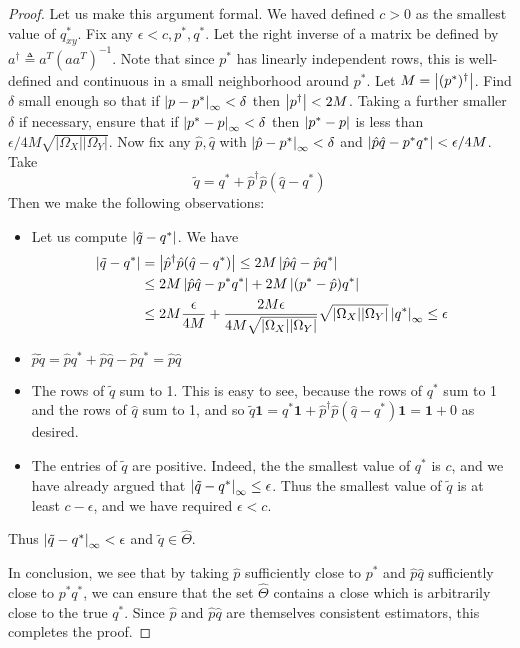 \begin{proof}
Let us make this argument formal.  We haved defined $c>0$ as the smallest value of $q^*_{xy}$.  Fix any $\epsilon<c, p^*,q^*$.  Let the right inverse of a matrix be defined by $a^\dagger \triangleq a^T (aa^T)^{-1}$.  Note that since $p^*$ has linearly independent rows, this is well-defined and continuous in a small neighborhood around $p^*$.  Let $M=\left|(p^*)^\dagger\right|$.  Find $\delta$ small enough so that if $\left|p-p^*\right|_\infty<\delta$ then $\left|p^\dagger\right|<2M$.  Taking a further smaller $\delta$ if necessary, ensure that if $\left|p^*-p\right|_\infty<\delta$ then $\left|p^*-p\right|$ is less than $\epsilon / 4M\sqrt{|\Omega_X||\Omega_Y|}$.  
Now fix any $\hat p,\hat q$ with $\left|\hat p-p^*\right|_\infty<\delta$ and $\left|\hat p \hat q - p^*q^*\right|<\epsilon/4M$.  Take
\[
\tilde q = q^* + \hat p^\dagger \hat p (\hat q - q^*)
\] 
Then we make the following observations:
\begin{itemize}
  \item Let us compute $\left|\tilde q -q^*\right|$. We have
   \begin{align*}
   \left|\tilde q -q^*\right| &= \left|\hat p^\dagger \hat p (\hat q - q^*)\right| \leq 2M \left|\hat p \hat q - \hat p q^*\right| \\
        &\leq 2M \left|\hat p \hat q - p^* q^*\right| + 2M\left|(p^* - \hat p)q^*\right|\\
        &\leq 2M \frac{\epsilon}{4M} + \frac{2M\epsilon}{4M\sqrt{|\Omega_X||\Omega_Y|}}\sqrt{|\Omega_X||\Omega_Y|}\left|q^*\right|_\infty \leq \epsilon 
   \end{align*}
  \item $\hat p \tilde q = \hat p q^* + \hat p \hat q - \hat p q^* = \hat p \hat q$
  \item The rows of $\tilde q$ sum to 1.  This is easy to see, because the rows of $q^*$ sum to 1 and the rows of $\hat q$ sum to 1, and so $\tilde q \mathbf{1} = q^* \mathbf{1} + \hat p^\dagger \hat p (\hat q - q^*) \mathbf{1} = \mathbf{1} + 0$ as desired.
  \item The entries of $\tilde q$ are positive.   Indeed, the the smallest value of $q^*$ is $c$, and we have already argued that $\left|\tilde q - q^*\right|_\infty\leq \epsilon$.  Thus the smallest value of $\tilde q$ is at least $c-\epsilon$, and we have required $\epsilon<c$.  
\end{itemize}
Thus $\left|\tilde q - q^*\right|_\infty<\epsilon$ and $\tilde q \in \hat \Theta$.  

In conclusion, we see that by taking $\hat p$ sufficiently close to $p^*$ and $\hat p \hat q$ sufficiently close to $p^*q^*$, we can ensure that the set $\hat \Theta$ contains a close which is arbitrarily close to the true $q^*$.  Since $\hat p$ and $\hat p \hat q$ are themselves consistent estimators, this completes the proof.
\end{proof}

